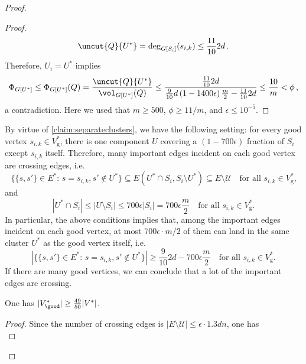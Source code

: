 \begin{proof}
\begin{proof}
	\begin{equation*}
		\uncut{Q}{U^*} = \deg_{G[S_i]}(s_{i,k}) \le  \frac{11}{10} 2d \, .
	\end{equation*}
	Therefore, $U_i = U^*$ implies
	\begin{equation*}
		\Phi_{G[U^*]} \le \Phi_{G[U^*]}(Q) = \frac{\uncut{Q}{U^*}}{\vol_{G[U^*]}(Q)} \le \frac{\frac{11}{10} 2d}{\frac{9}{10}d \left(1-1400{\epsilon}\right) \frac{m}{2}-\frac{11}{10}2d} \le \frac{10}{m} < \phi \, ,
	\end{equation*}
	a contradiction. Here we used that $m \ge 500$, $\phi \ge 11/m$, and $\epsilon \le 10^{-5}$.
\end{proof}
	\noindent
	By virtue of \cref{claim:separateclusters}, we have the following setting: for every good vertex $s_{i,k} \in V^*_{\text{g}}$, there is one component $U$ covering a $(1-700\epsilon)$ fraction of $S_i$ except $s_{i,k}$ itself. Therefore, many important edges incident on each good vertex are crossing edges, i.e.
	\begin{equation*}
		\{\{s,s'\} \in E^* : \, s = s_{i,k}, s' \notin U^*\} \subseteq E(U^* \cap S_i, S_i \setminus U^*) \subseteq E \setminus \mathcal{U} \quad \text{for all $s_{i,k} \in V^*_{\text{g}}$,}
	\end{equation*}
	and
	\begin{equation*}
		|U^* \cap S_i| \le  |U \setminus S_i| \le 700{\epsilon}  |S_i| = 700{\epsilon} \frac{m}{2}\quad \text{for all $s_{i,k} \in V^*_{\text{g}}$.}
	\end{equation*}
	In particular, the above conditions implies that, among the important edges incident on each good vertex, at most $700\epsilon \cdot m/2$ of them can land in the same cluster $U^*$ as the good vertex itself, i.e.
	\begin{equation}
		\label{eq:pervertexguarantee}
		|\{\{s,s'\} \in E^* : \, s = s_{i,k}, s' \notin U^*\}| \ge \frac{9}{10}2d - 700{\epsilon} \frac{m}{2}  \quad \text{for all $s_{i,k} \in V^*_{\text{g}}$.}
	\end{equation}
	If there are many good vertices, we can conclude that a lot of the important edges are crossing.
		\begin{claim}
		\label{claim:mannygood}
		One has $|V^*_{\good}| \ge  \frac{49}{50}|V^*| $.
	\end{claim}
	\begin{proof}
		Since the number of crossing edges is $|E \setminus \mathcal{U}| \le \epsilon \cdot 1.3 dn$, one has
		\begin{equation}
			\label{goodvertices:2}

\end{equation}
\end{proof}
\end{proof}
